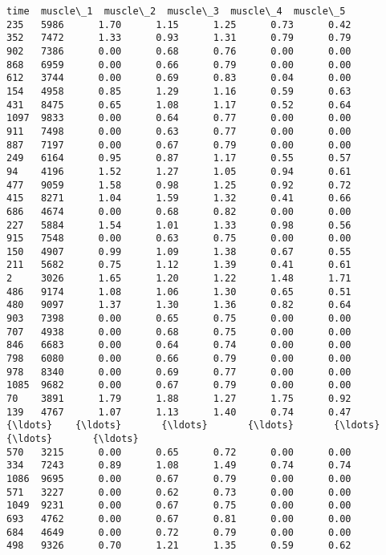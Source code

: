 \documentclass[11pt]{article}
\begin{document}
    \begin{Verbatim}[commandchars=\\\{\}]
      time  muscle\_1  muscle\_2  muscle\_3  muscle\_4  muscle\_5
235   5986      1.70      1.15      1.25      0.73      0.42
352   7472      1.33      0.93      1.31      0.79      0.79
902   7386      0.00      0.68      0.76      0.00      0.00
868   6959      0.00      0.66      0.79      0.00      0.00
612   3744      0.00      0.69      0.83      0.04      0.00
154   4958      0.85      1.29      1.16      0.59      0.63
431   8475      0.65      1.08      1.17      0.52      0.64
1097  9833      0.00      0.64      0.77      0.00      0.00
911   7498      0.00      0.63      0.77      0.00      0.00
887   7197      0.00      0.67      0.79      0.00      0.00
249   6164      0.95      0.87      1.17      0.55      0.57
94    4196      1.52      1.27      1.05      0.94      0.61
477   9059      1.58      0.98      1.25      0.92      0.72
415   8271      1.04      1.59      1.32      0.41      0.66
686   4674      0.00      0.68      0.82      0.00      0.00
227   5884      1.54      1.01      1.33      0.98      0.56
915   7548      0.00      0.63      0.75      0.00      0.00
150   4907      0.99      1.09      1.38      0.67      0.55
211   5682      0.75      1.12      1.39      0.41      0.61
2     3026      1.65      1.20      1.22      1.48      1.71
486   9174      1.08      1.06      1.30      0.65      0.51
480   9097      1.37      1.30      1.36      0.82      0.64
903   7398      0.00      0.65      0.75      0.00      0.00
707   4938      0.00      0.68      0.75      0.00      0.00
846   6683      0.00      0.64      0.74      0.00      0.00
798   6080      0.00      0.66      0.79      0.00      0.00
978   8340      0.00      0.69      0.77      0.00      0.00
1085  9682      0.00      0.67      0.79      0.00      0.00
70    3891      1.79      1.88      1.27      1.75      0.92
139   4767      1.07      1.13      1.40      0.74      0.47
{\ldots}    {\ldots}       {\ldots}       {\ldots}       {\ldots}       {\ldots}       {\ldots}
570   3215      0.00      0.65      0.72      0.00      0.00
334   7243      0.89      1.08      1.49      0.74      0.74
1086  9695      0.00      0.67      0.79      0.00      0.00
571   3227      0.00      0.62      0.73      0.00      0.00
1049  9231      0.00      0.67      0.75      0.00      0.00
693   4762      0.00      0.67      0.81      0.00      0.00
684   4649      0.00      0.72      0.79      0.00      0.00
498   9326      0.70      1.21      1.35      0.59      0.62

\end{Verbatim}
\end{document}
